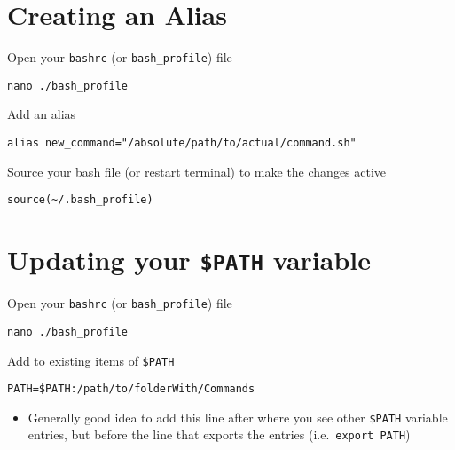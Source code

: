 \documentclass[
  letterpaper,
  DIV=11,
  numbers=noendperiod]{scrreprt}
\providecommand{\tightlist}{%
  \setlength{\itemsep}{0pt}\setlength{\parskip}{0pt}}\usepackage{longtable,booktabs,array}
\begin{document}
\hypertarget{creating-an-alias}{%
\section*{\texorpdfstring{\textbf{Creating an
Alias}}{Creating an Alias}}\label{creating-an-alias}}


Open your \texttt{bashrc} (or \texttt{bash\_profile}) file

\begin{verbatim}
nano ./bash_profile
\end{verbatim}

Add an alias

\begin{verbatim}
alias new_command="/absolute/path/to/actual/command.sh"
\end{verbatim}

Source your bash file (or restart terminal) to make the changes active

\begin{verbatim}
source(~/.bash_profile)
\end{verbatim}

\hypertarget{updating-your-path-variable}{%
\section*{\texorpdfstring{\textbf{Updating your \texttt{\$PATH}
variable}}{Updating your \$PATH variable}}\label{updating-your-path-variable}}


Open your \texttt{bashrc} (or \texttt{bash\_profile}) file

\begin{verbatim}
nano ./bash_profile
\end{verbatim}

Add to existing items of \texttt{\$PATH}

\begin{verbatim}
PATH=$PATH:/path/to/folderWith/Commands
\end{verbatim}

\begin{itemize}
\tightlist
\item
  Generally good idea to add this line after where you see other
  \texttt{\$PATH} variable entries, but before the line that exports the
  entries (i.e.~\texttt{export\ PATH})
\end{itemize}
\end{document}
